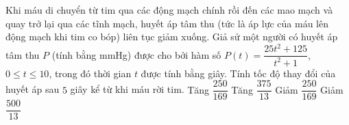 \begin{ex}%
	Khi máu di chuyển từ tim qua các động mạch chính rồi đến các mao mạch và quay trở lại qua các tĩnh mạch, huyết áp tâm thu (tức là áp lực của máu lên động mạch khi tim co bóp) liên tục giảm xuống. Giả sử một người có huyết áp tâm thu $P$ (tính bằng mmHg) được cho bởi hàm số $P(t)=\dfrac{25t^2+125}{t^2+1}$, $0\le t	\le 10$, trong đó thời gian $t$ được tính bằng giây. Tính tốc độ thay đổi của huyết áp sau $5$ giây kể từ khi máu rời tim.
	\choice
	{Tăng $\dfrac{250}{169}$}
	{Tăng $\dfrac{375}{13}$}
	{\True Giảm $\dfrac{250}{169}$}
	{Giảm $\dfrac{500}{13}$}
\end{ex}


